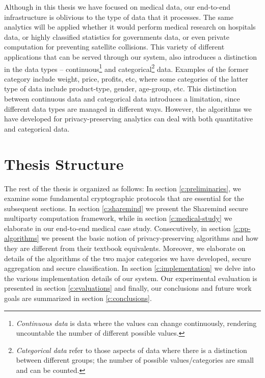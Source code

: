 Although in this thesis we have focused on medical data, our end-to-end infrastructure is oblivious to the type of data that it processes.
The same analytics will be applied whether it would perform medical research on hospitals data, or highly classified statistics for governments data, or even private computation for preventing satellite collisions.
This variety of different applications that can be served through our system, also introduces a distinction in the data types -- continuous\footnote{\textit{Continuous data} is data where the values can change continuously, rendering uncountable the number of different possible values.} and categorical\footnote{\textit{Categorical data} refer to those aspects of data where there is a distinction between different groups; the number of possible values/categories are small and can be counted.} data.
Examples of the former category include weight, price, profits, etc, where some categories of the latter type of data include product-type, gender, age-group, etc.
This distinction between continuous data and categorical data introduces a limitation, since different data types are managed in different ways.
However, the algorithms we have developed for privacy-preserving analytics can deal with both quantitative and categorical data.




\section{Thesis Structure}\label{s:thesis-structure}
The rest of the thesis is organized as follows: In section \ref{c:preliminaries}, we examine some fundamental cryptographic protocols that are essential for the subsequent sections.
In section \ref{c:sharemind} we present the Sharemind secure multiparty computation framework, while in section \ref{c:medical-study} we elaborate in our end\hyp to\hyp end medical case study.
Consecutively, in section \ref{c:pp-algorithms} we present the basic notion of privacy-preserving algorithms and how they are different from their textbook equivalents.
Moreover, we elaborate on details of the algorithms of the two major categories we have developed, secure aggregation and secure classification.
In section \ref{c:implementation} we delve into the various implementation details of our system.
Our experimental evaluation is presented in section \ref{c:evaluations} and finally, our conclusions and future work goals are summarized in section \ref{c:conclusions}.

